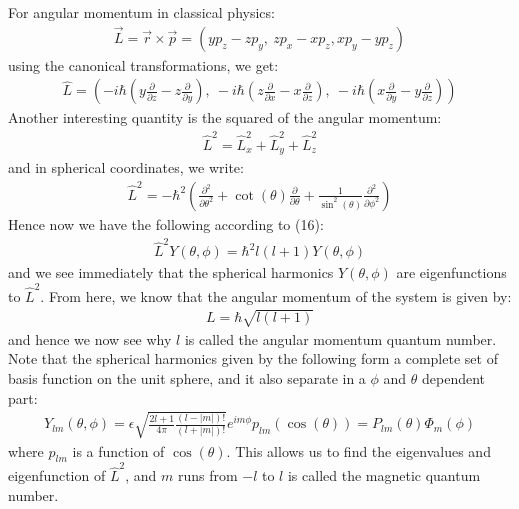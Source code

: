 \documentclass[11pt]{article}
\theoremstyle{break}
\theoremstyle{break}
\newcommand{\pd}{\partial}
\begin{document}
For angular momentum in classical physics:
\begin{align*}
\vec{L} = \vec{r}\times \vec{p} = (yp_z - zp_y,\ zp_x - xp_z, xp_y - yp_z)
\end{align*}
using the canonical transformations, we get:
\begin{align*}
\hat{L} = \left( -i\hbar \left( y \frac{\pd}{\pd z} - z \frac{\pd}{\pd y}\right), \ -i\hbar \left( z \frac{\pd}{\pd x}-x\frac{\pd}{\pd z}\right), \ -i\hbar\left( x \frac{\pd}{\pd y} - y \frac{\pd}{\pd z}\right) \right)
\end{align*}
Another interesting quantity is the squared of the angular momentum:
\begin{align*}
\hat{L}^2 = \hat{L}_x^2 + \hat{L}_y^2 + \hat{L}_z^2
\end{align*}
and in spherical coordinates, we write:
\begin{align*}
\hat{L}^2 = -\hbar^2 \left( \frac{\pd^2}{\pd \theta^2} + \cot(\theta) \frac{\pd}{\pd \theta}+ \frac{1}{\sin^2(\theta)}\frac{\pd^2}{\pd \phi^2}\right)
\end{align*}
Hence now we have the following according to (16):
\begin{align*}
\hat{L}^2 Y (\theta,\phi) = \hbar^2l(l+1) Y(\theta, \phi)
\end{align*}
and we see immediately that the spherical harmonics $Y(\theta, \phi)$ are eigenfunctions to $\hat{L}^2$. From here, we know that the angular momentum of the system is given by:
\begin{align*}
L = \hbar\sqrt{ l(l+1)}
\end{align*}
and hence we now see why $l$ is called the angular momentum quantum number.\\

Note that the spherical harmonics given by the following form a complete set of basis function on the unit sphere, and it also separate in a $\phi$ and $\theta$ dependent part:
\begin{align*}
Y_{lm}(\theta, \phi) = \epsilon\sqrt{\frac{2l+1}{4\pi}\frac{(l-|m|)!}{(l+|m|)!} }e^{im \phi}p_{lm}(\cos(\theta)) = P_{lm}(\theta)\Phi_m(\phi)
\end{align*}
where $p_{lm}$ is a function of $\cos(\theta)$. This allows us to find the eigenvalues and eigenfunction of $\hat{L}^2$, and $m$ runs from $-l$ to $l$ is called the magnetic quantum number.  \\
\end{document}
